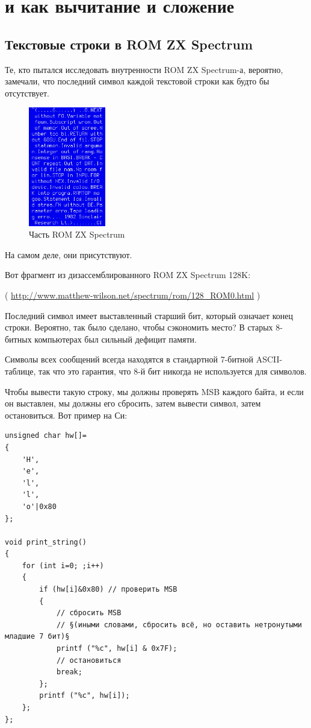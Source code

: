 \section{ и  как вычитание и сложение}

\subsection{Текстовые строки в \ac{ROM} ZX Spectrum}
\label{ZX Spectrum}

Те, кто пытался исследовать внутренности \ac{ROM} ZX Spectrum-а, вероятно, замечали,
что последний символ каждой текстовой строки как будто бы отсутствует.

\begin{figure}[H]
\centering
\includegraphics[width=0.3\textwidth]{fundamentals/zx_spectrum_ROM.png}
\caption{Часть \ac{ROM} ZX Spectrum}
\end{figure}

На самом деле, они присутствуют.

Вот фрагмент из дизассемблированного \ac{ROM} ZX Spectrum 128K:


( \url{http://www.matthew-wilson.net/spectrum/rom/128_ROM0.html} )

Последний символ имеет выставленный старший бит, который означает конец строки.
Вероятно, так было сделано, чтобы сэкономить место?
В старых 8-битных компьютерах был сильный дефицит памяти.

Символы всех сообщений всегда находятся в стандартной 7-битной \ac{ASCII}-таблице, так что это гарантия,
что 8-й бит никогда не используется для символов.

Чтобы вывести такую строку, мы должны проверять \ac{MSB} каждого байта, и если он выставлен, мы должны его сбросить,
затем вывести символ, затем остановиться.
Вот пример на Си:

\begin{lstlisting}[style=customc]
unsigned char hw[]=
{
	'H',
	'e',
	'l',
	'l',
	'o'|0x80
};

void print_string()
{
	for (int i=0; ;i++)
	{
		if (hw[i]&0x80) // проверить MSB
		{
			// сбросить MSB
			// §(иными словами, сбросить всё, но оставить нетронутыми младшие 7 бит)§
			printf ("%c", hw[i] & 0x7F);
			// остановиться
			break;
		};
		printf ("%c", hw[i]);
	};
};
\end{lstlisting}


